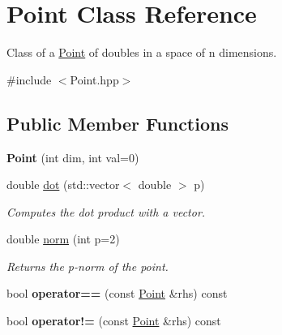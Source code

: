\hypertarget{class_point}{}\section{Point Class Reference}
\label{class_point}


Class of a \hyperlink{class_point}{Point} of doubles in a space of n dimensions.  




{\ttfamily \#include $<$Point.\+hpp$>$}

\subsection*{Public Member Functions}
\begin{DoxyCompactItemize}
\item 
\mbox{\label{class_point_aa2847c6f3245886323975a5087f5c1f5}} 
{\bfseries Point} (int dim, int val=0)
\item 
double \hyperlink{class_point_a9d8da6733d7e4110a62e8d0f82676761}{dot} (std\+::vector$<$ double $>$ p)
\begin{DoxyCompactList}\small\item\em Computes the dot product with a vector. \end{DoxyCompactList}\item 
double \hyperlink{class_point_aab64e3f0a9eecba00a1607eb4c7768c3}{norm} (int p=2)
\begin{DoxyCompactList}\small\item\em Returns the p-\/norm of the point. \end{DoxyCompactList}\item 
\mbox{\label{class_point_a0c0525e4a539e462236840739cd81495}} 
bool {\bfseries operator==} (const \hyperlink{class_point}{Point} \&rhs) const
\item 
\mbox{\label{class_point_a412beea7de93a9e22b8ace5fb4170111}} 
bool {\bfseries operator!=} (const \hyperlink{class_point}{Point} \&rhs) const
\end{DoxyCompactItemize}
